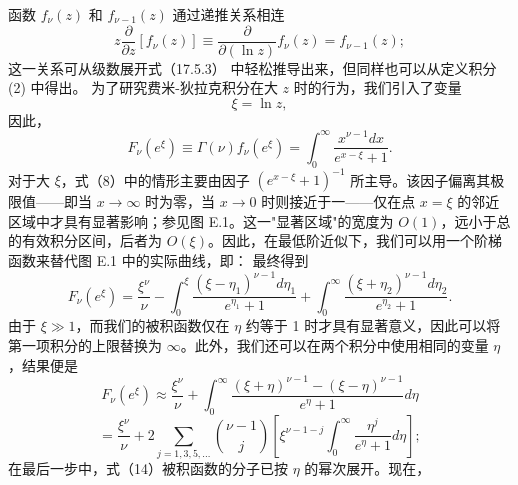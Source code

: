 函数 \(f_{\nu}(z)\) 和 \(f_{\nu-1}(z)\) 通过递推关系相连
\begin{equation}\tag{17.5.8}\label{eq:17.5.8}
z \frac { \partial } { \partial z } [ f _ { \nu } ( z ) ] \equiv \frac { \partial } { \partial ( \ln z ) } f _ { \nu } ( z ) = f _ { \nu - 1 } ( z ) ;
\end{equation}
这一关系可从级数展开式（17.5.3） 中轻松推导出来，但同样也可以从定义积分 (2) 中得出。
为了研究费米-狄拉克积分在大 \(z\) 时的行为，我们引入了变量
\begin{equation}\tag{17.5.9}\label{eq:17.5.9}
\xi = \ln z ,
\end{equation}
因此，
\begin{equation}\tag{17.5.10}\label{eq:17.5.10}
F _ { \nu } ( e ^{\xi} ) \equiv \Gamma ( \nu ) f _ { \nu } ( e ^{\xi} ) = \int _ { 0 } ^{\infty} \frac { x ^{\nu - 1} d x } { e ^{x - \xi} + 1 } .
\end{equation}
对于大 \(\xi\)，式（8）中的情形主要由因子 \((e^{x-\xi}+1)^{-1}\) 所主导。该因子偏离其极限值——即当 \(x\to\infty\) 时为零，当 \(x\to0\) 时则接近于一——仅在点 \(x=\xi\) 的邻近区域中才具有显著影响；参见图 E.1。这一"显著区域"的宽度为 \(O(1)\)，远小于总的有效积分区间，后者为 \(O(\xi)\)。因此，在最低阶近似下，我们可以用一个阶梯函数来替代图 E.1 中的实际曲线，即：
最终得到
\begin{equation}\tag{17.5.11}\label{eq:17.5.11}
F _ { \nu } ( e ^{\xi} ) = \frac { \xi ^{\nu} } { \nu } - \int _ { 0 } ^{\xi} \frac { ( \xi - \eta _ { 1 } ) ^{\nu - 1} d \eta _ { 1 } } { e ^{\eta _ { 1} } + 1 } + \int _ { 0 } ^{\infty} \frac { ( \xi + \eta _ { 2 } ) ^{\nu - 1} d \eta _ { 2 } } { e ^{\eta _ { 2} } + 1 } .
\end{equation}
由于 \(\xi \gg 1\)，而我们的被积函数仅在 \(\eta\) 约等于 1 时才具有显著意义，因此可以将第一项积分的上限替换为 \(\infty\)。此外，我们还可以在两个积分中使用相同的变量 \(\eta\)，结果便是
\begin{equation}\tag{17.5.12}\label{eq:17.5.12}
F _ { \nu } ( e ^{\xi} ) \approx \frac { \xi ^{\nu} } { \nu } + \int _ { 0 } ^{\infty} \frac { ( \xi + \eta ) ^{\nu - 1} - ( \xi - \eta ) ^{\nu - 1} } { e ^{\eta} + 1 } d \eta
\end{equation}
\begin{equation}\tag{17.5.13}\label{eq:17.5.13}
= \frac { \xi ^{\nu} } { \nu } + 2 \sum _ { j = 1 , 3 , 5 , \ldots } { \binom { \nu - 1 } { j } } \left[ \xi ^{\nu - 1 - j} \int _ { 0 } ^{\infty} \frac { \eta ^{j} } { e ^{\eta} + 1 } d \eta \right] ;
\end{equation}
在最后一步中，式（14）被积函数的分子已按 \(\eta\) 的幂次展开。现在，
